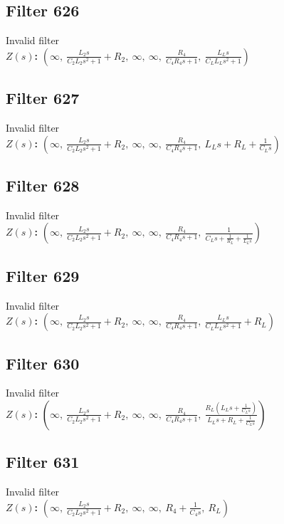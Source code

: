 \documentclass{article}
\begin{document}
\subsection*{Filter 626}
Invalid filter \\ 
\textbf{$Z(s)$:} $\left( \infty, \  \frac{L_{2} s}{C_{2} L_{2} s^{2} + 1} + R_{2}, \  \infty, \  \infty, \  \frac{R_{4}}{C_{4} R_{4} s + 1}, \  \frac{L_{L} s}{C_{L} L_{L} s^{2} + 1}\right)$ \\ 
\subsection*{Filter 627}
Invalid filter \\ 
\textbf{$Z(s)$:} $\left( \infty, \  \frac{L_{2} s}{C_{2} L_{2} s^{2} + 1} + R_{2}, \  \infty, \  \infty, \  \frac{R_{4}}{C_{4} R_{4} s + 1}, \  L_{L} s + R_{L} + \frac{1}{C_{L} s}\right)$ \\ 
\subsection*{Filter 628}
Invalid filter \\ 
\textbf{$Z(s)$:} $\left( \infty, \  \frac{L_{2} s}{C_{2} L_{2} s^{2} + 1} + R_{2}, \  \infty, \  \infty, \  \frac{R_{4}}{C_{4} R_{4} s + 1}, \  \frac{1}{C_{L} s + \frac{1}{R_{L}} + \frac{1}{L_{L} s}}\right)$ \\ 
\subsection*{Filter 629}
Invalid filter \\ 
\textbf{$Z(s)$:} $\left( \infty, \  \frac{L_{2} s}{C_{2} L_{2} s^{2} + 1} + R_{2}, \  \infty, \  \infty, \  \frac{R_{4}}{C_{4} R_{4} s + 1}, \  \frac{L_{L} s}{C_{L} L_{L} s^{2} + 1} + R_{L}\right)$ \\ 
\subsection*{Filter 630}
Invalid filter \\ 
\textbf{$Z(s)$:} $\left( \infty, \  \frac{L_{2} s}{C_{2} L_{2} s^{2} + 1} + R_{2}, \  \infty, \  \infty, \  \frac{R_{4}}{C_{4} R_{4} s + 1}, \  \frac{R_{L} \left(L_{L} s + \frac{1}{C_{L} s}\right)}{L_{L} s + R_{L} + \frac{1}{C_{L} s}}\right)$ \\ 
\subsection*{Filter 631}
Invalid filter \\ 
\textbf{$Z(s)$:} $\left( \infty, \  \frac{L_{2} s}{C_{2} L_{2} s^{2} + 1} + R_{2}, \  \infty, \  \infty, \  R_{4} + \frac{1}{C_{4} s}, \  R_{L}\right)$ \\ 
\end{document}

